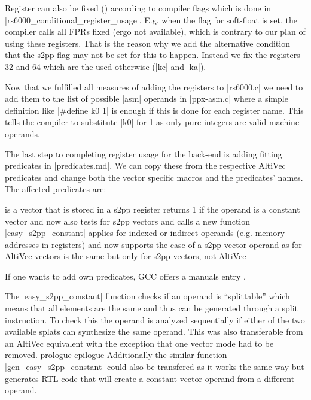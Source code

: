Register can also be fixed () according to compiler flags which is done in |rs6000_conditional_register_usage|.
E.g. when the flag for soft-float is set, the compiler calls all FPRs fixed (ergo not available), which is contrary to our plan of using these registers.
That is the reason why we add the alternative condition that the s2pp flag may not be set for this to happen.
Instead we fix the registers 32 and 64 which are the used otherwise (|kc| and |ka|).

Now that we fulfilled all measures of adding the registers to |rs6000.c| we need to add them to the list of possible |asm| operands in 
|ppx-asm.c| where a simple definition like |#define k0 1| is enough if this is done for each register name.
This tells the compiler to substitute |k0| for 1 as only pure integers are valid machine operands.

The last step to completing register usage for the back-end is adding fitting predicates in |predicates.md|.
We can copy these from the respective AltiVec predicates and change both the vector specific macros and the predicates' names.
The affected predicates are:
\begin{description}
         is a vector that is stored in a s2pp register
         returns 1 if the operand is a constant vector and now also tests for s2pp vectors and calls a new function |easy_s2pp_constant|
         applies for indexed or indirect operands (e.g. memory addresses in registers) and now supports the case of a s2pp vector operand as for AltiVec vectors
         is the same but only for s2pp vectors, not AltiVec
\end{description}
If one wants to add own predicates, GCC offers a manuals entry .

The |easy_s2pp_constant| function checks if an operand is ``splittable'' which means that all elements are the same and thus can be generated through a split instruction.
To check this the operand is analyzed sequentially if either of the two available splats can synthesize the same operand.
This was also transferable from an AltiVec equivalent with the exception that one vector mode had to be removed.
prologue epilogue
Additionally the similar function |gen_easy_s2pp_constant| could also be transfered as it works the same way but generates RTL code that will create a constant vector operand from a different operand.


